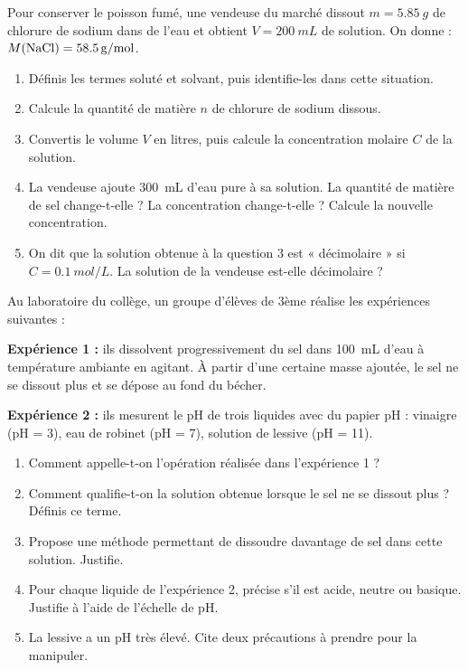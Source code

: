 \documentclass[11pt]{article}
\newcounter{popsec}
\newcounter{popsub}
\newcommand{\courssub}[1]{%
  \stepcounter{popsub}%
  \par\vspace{9pt}\noindent{\popxbold\fontsize{11.5}{13}\selectfont\color{popink}{\color{poporange}\thepopsec.\thepopsub}\hspace{6pt}#1}\par\nopagebreak\vspace{4pt}
}
\begin{document}
\courssub{Je me prépare au Bac}

\begin{exercice}
Pour conserver le poisson fumé, une vendeuse du marché dissout $m = \SI{5,85}{g}$ de chlorure de sodium  dans de l'eau et obtient $V = \SI{200}{mL}$ de solution. On donne : $M(\ce{NaCl}) = \SI{58,5}{g/mol}$.

\begin{enumerate}
\item Définis les termes soluté et solvant, puis identifie-les dans cette situation.
\item Calcule la quantité de matière $n$ de chlorure de sodium dissous.
\item Convertis le volume $V$ en litres, puis calcule la concentration molaire $C$ de la solution.
\item La vendeuse ajoute \SI{300}{mL} d'eau pure à sa solution. La quantité de matière de sel change-t-elle ? La concentration change-t-elle ? Calcule la nouvelle concentration.
\item On dit que la solution obtenue à la question 3 est « décimolaire » si $C = \SI{0,1}{mol/L}$. La solution de la vendeuse est-elle décimolaire ?
\end{enumerate}
\end{exercice}

\begin{exercice}
Au laboratoire du collège, un groupe d'élèves de 3ème réalise les expériences suivantes :

\textbf{Expérience 1 :} ils dissolvent progressivement du sel dans \SI{100}{mL} d'eau à température ambiante en agitant. À partir d'une certaine masse ajoutée, le sel ne se dissout plus et se dépose au fond du bécher.

\textbf{Expérience 2 :} ils mesurent le pH de trois liquides avec du papier pH : vinaigre (pH = 3), eau de robinet (pH = 7), solution de lessive (pH = 11).

\begin{enumerate}
\item Comment appelle-t-on l'opération réalisée dans l'expérience 1 ?
\item Comment qualifie-t-on la solution obtenue lorsque le sel ne se dissout plus ? Définis ce terme.
\item Propose une méthode permettant de dissoudre davantage de sel dans cette solution. Justifie.
\item Pour chaque liquide de l'expérience 2, précise s'il est acide, neutre ou basique. Justifie à l'aide de l'échelle de pH.
\item La lessive a un pH très élevé. Cite deux précautions à prendre pour la manipuler.
\end{enumerate}
\end{exercice}
\end{document}
